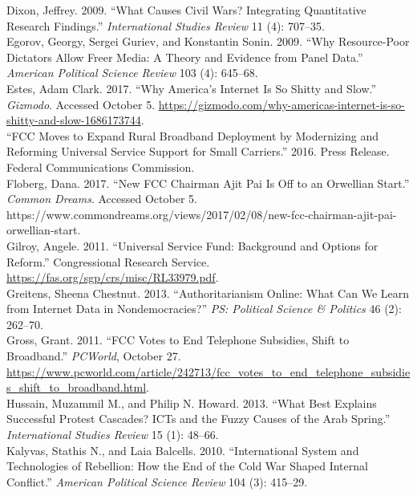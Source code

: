 \documentclass[12pt]{article}
\begin{document}
	\hspace*{-1cm}Dixon, Jeffrey. 2009. “What Causes Civil Wars? Integrating Quantitative Research Findings.” \textit{International Studies Review }11 (4): 707--35. \\
	\hspace*{-1cm}Egorov, Georgy, Sergei Guriev, and Konstantin Sonin. 2009. “Why Resource-Poor Dictators Allow Freer Media: A Theory and Evidence from Panel Data.” \textit{American Political Science Review} 103 (4): 645--68. \\
	\hspace*{-1cm}Estes, Adam Clark. 2017. “Why America’s Internet Is So Shitty and Slow.” \textit{Gizmodo}. Accessed October 5. \url{https://gizmodo.com/why-americas-internet-is-so-shitty-and-slow-1686173744}.\\
	\hspace*{-1cm}“FCC Moves to Expand Rural Broadband Deployment by Modernizing and Reforming Universal Service Support for Small Carriers.” 2016. Press Release. Federal Communications Commission.\\
	\hspace*{-1cm}Floberg, Dana. 2017. “New FCC Chairman Ajit Pai Is Off to an Orwellian Start.” \textit{Common Dreams}. Accessed October 5. https://www.commondreams.org/views/2017/02/08/new-fcc-chairman-ajit-pai-orwellian-start.\\
	\hspace*{-1cm}Gilroy, Angele. 2011. “Universal Service Fund: Background and Options for Reform.” Congressional Research Service. \url{https://fas.org/sgp/crs/misc/RL33979.pdf}.\\
	\hspace*{-1cm}Greitens, Sheena Chestnut. 2013. “Authoritarianism Online: What Can We Learn from Internet Data in Nondemocracies?” \textit{PS: Political Science \& Politics} 46 (2): 262--70.\\
	\hspace*{-1cm}Gross, Grant. 2011. “FCC Votes to End Telephone Subsidies, Shift to Broadband.” \textit{PCWorld}, October 27. \url{https://www.pcworld.com/article/242713/fcc\_votes\_to\_end\_telephone\_subsidies\_shift\_to\_broadband.html}.\\
	\hspace*{-1cm}Hussain, Muzammil M., and Philip N. Howard. 2013. “What Best Explains Successful Protest Cascades? ICTs and the Fuzzy Causes of the Arab Spring.” \textit{International Studies Review }15 (1): 48--66.\\
	\hspace*{-1cm}Kalyvas, Stathis N., and Laia Balcells. 2010. “International System and Technologies of Rebellion: How the End of the Cold War Shaped Internal Conflict.” \textit{American Political Science Review} 104 (3): 415--29.\\
\end{document}
